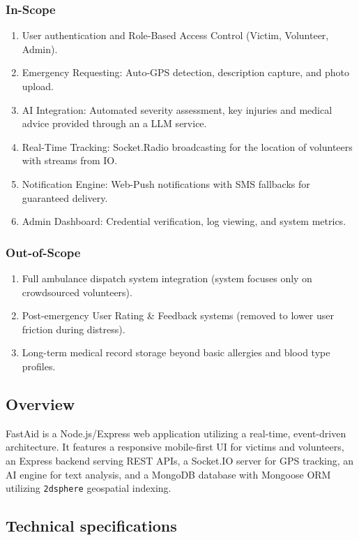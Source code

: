 \documentclass[12pt,a4paper]{article}
\begin{document}
\subsubsection*{In-Scope}
\begin{enumerate}[leftmargin=2em]
  \item User authentication and Role-Based Access Control (Victim, Volunteer, Admin).
  \item Emergency Requesting: Auto-GPS detection, description capture, and photo upload.
  \item AI Integration: Automated severity assessment, key injuries and medical advice provided through an a LLM service.
  \item Real-Time Tracking: Socket.Radio broadcasting for the location of volunteers with streams from IO.
  \item Notification Engine: Web-Push notifications with SMS fallbacks for guaranteed delivery.
  \item Admin Dashboard: Credential verification, log viewing, and system metrics.
\end{enumerate}

\subsubsection*{Out-of-Scope}
\begin{enumerate}[leftmargin=2em]
  \item Full ambulance dispatch system integration (system focuses only on crowdsourced volunteers).
  \item Post-emergency User Rating \& Feedback systems (removed to lower user friction during distress).
  \item Long-term medical record storage beyond basic allergies and blood type profiles.
\end{enumerate}

\subsection{Overview}
FastAid is a Node.js/Express web application utilizing a real-time, event-driven architecture. It features a responsive mobile-first UI for victims and volunteers, an Express backend serving REST APIs, a Socket.IO server for GPS tracking, an AI engine for text analysis, and a MongoDB database with Mongoose ORM utilizing \texttt{2dsphere} geospatial indexing.

\subsection{Technical specifications}
\label{sec:techspec}
\end{document}

